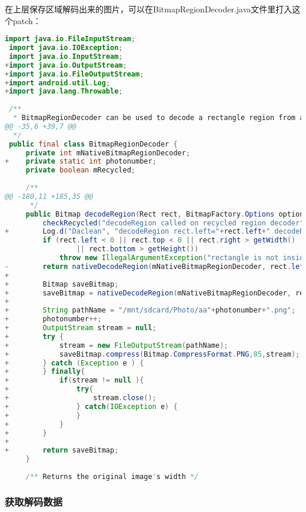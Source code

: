 在上层保存区域解码出来的图片，可以在BitmapRegionDecoder.java文件里打入这个patch：
\begin{lstlisting}[language={Java},label=skia-debug-save-image,caption=补丁]
 import java.io.FileInputStream;
 import java.io.IOException;
 import java.io.InputStream;
+import java.io.OutputStream;
+import java.io.FileOutputStream;
+import android.util.Log;
+import java.lang.Throwable;
 
 /**
  * BitmapRegionDecoder can be used to decode a rectangle region from an image.
@@ -35,6 +39,7 @@
  */
 public final class BitmapRegionDecoder {
     private int mNativeBitmapRegionDecoder;
+    private static int photonumber;
     private boolean mRecycled;
 
     /**
@@ -180,11 +185,35 @@
      */
     public Bitmap decodeRegion(Rect rect, BitmapFactory.Options options) {
         checkRecycled("decodeRegion called on recycled region decoder");
+        Log.d("Daclean", "decodeRegion rect.left="+rect.left+" decodeRegion rect.top="+rect.top +" decodeRegion rect.right="+rect.right+" decodeRegion rect.bottom="+rect.bottom, new Throwable("decodeRegion"));
         if (rect.left < 0 || rect.top < 0 || rect.right > getWidth()
                 || rect.bottom > getHeight())
             throw new IllegalArgumentException("rectangle is not inside the image");
-        return nativeDecodeRegion(mNativeBitmapRegionDecoder, rect.left, rect.top, rect.right - rect.left, rect.bottom - rect.top, options);
+
+        Bitmap saveBitmap;
+        saveBitmap = nativeDecodeRegion(mNativeBitmapRegionDecoder, rect.left, rect.top, rect.right - rect.left, rect.bottom - rect.top, options);
+            
+        String pathName = "/mnt/sdcard/Photo/aa"+photonumber+".png";
+        photonumber++;
+        OutputStream stream = null;
+        try {
+            stream = new FileOutputStream(pathName);         
+            saveBitmap.compress(Bitmap.CompressFormat.PNG,85,stream);
+        } catch (Exception e ) {
+        } finally{
+            if(stream != null ){
+                try{
+                    stream.close();
+                } catch(IOException e) {
+                }
+            }
+        }
+         
+        return saveBitmap; 
     }
 
     /** Returns the original image's width */
\end{lstlisting}

\subsubsection{获取解码数据}
\label{sec:skia-debug-raw}

